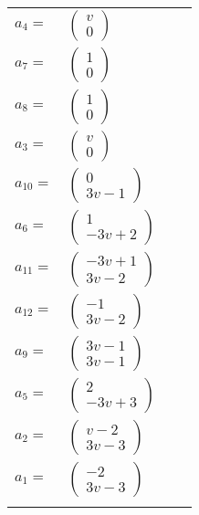 \documentclass[1p]{elsarticle_modified}
\theoremstyle{definition}
\begin{document}
\begin{tabular}{m{7pt} m{180pt} m{7pt} m{180pt} }
\flushright $a_{4}=$&$\begin{pmatrix}v\\0\end{pmatrix}$ \\
\flushright $a_{7}=$&$\begin{pmatrix}1\\0\end{pmatrix}$ \\
\flushright $a_{8}=$&$\begin{pmatrix}1\\0\end{pmatrix}$ \\
\flushright $a_{3}=$&$\begin{pmatrix}v\\0\end{pmatrix}$ \\
\flushright $a_{10}=$&$\begin{pmatrix}0\\3 v-1\end{pmatrix}$ \\
\flushright $a_{6}=$&$\begin{pmatrix}1\\-3 v+2\end{pmatrix}$ \\
\flushright $a_{11}=$&$\begin{pmatrix}-3 v+1\\3 v-2\end{pmatrix}$ \\
\flushright $a_{12}=$&$\begin{pmatrix}-1\\3 v-2\end{pmatrix}$ \\
\flushright $a_{9}=$&$\begin{pmatrix}3 v-1\\3 v-1\end{pmatrix}$ \\
\flushright $a_{5}=$&$\begin{pmatrix}2\\-3 v+3\end{pmatrix}$ \\
\flushright $a_{2}=$&$\begin{pmatrix}v-2\\3 v-3\end{pmatrix}$ \\
\flushright $a_{1}=$&$\begin{pmatrix}-2\\3 v-3\end{pmatrix}$\\&\end{tabular}
\end{document}
